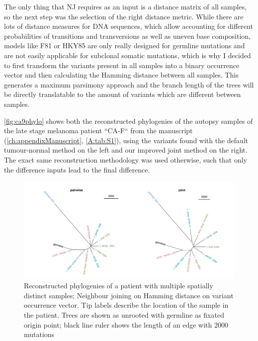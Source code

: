 The only thing that NJ requires as an input is a distance matrix of all samples, so the next step was the selection of the right distance metric. While there are lots of distance measures for DNA sequences, which allow accounting for different probabilities of transitions and transversions as well as uneven base composition, models like F81 \cite{Felsenstein1981} or HKY85 \cite{Hasegawa1985} are only really designed for germline mutations and are not easily applicable for subclonal somatic mutations, which is why I decided to first transform the variants present in all samples into a binary occurrence vector and then calculating the Hamming distance \cite{Hamming1950} between all samples. This generates a maximum parsimony approach and the branch length of the trees will be directly translatable to the amount of variants which are different between samples. 

\autoref{fig:ca9phylo} shows both the reconstructed phylogenies of the autopsy samples of the late stage melanoma patient ``CA-F`` from the manuscript (\autoref{ch:appendixManuscript}, \autoref{A:tab:S1}), using the variants found with the default tumour-normal method on the left and our improved joint method on the right. The exact same reconstruction methodology was used otherwise, such that only the difference inputs lead to the final difference.

\begin{figure}[!ht]
\centering
\includegraphics[width=.99\linewidth]{Figures/phyloCA9.pdf}
\caption[Reconstructed phylogenies of joint samples]{Reconstructed phylogenies of a patient with multiple spatially distinct samples; Neighbour joining on Hamming distance on variant occurrence vector. Tip labels describe the location of the sample in the patient. Trees are shown as unrooted with germline as fixated origin point; black line ruler shows the length of an edge with 2000 mutations}\label{fig:ca9phylo}
\end{figure}

